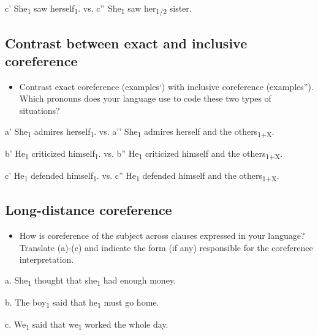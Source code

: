 \documentclass[output=paper]{langsci/langscibook} \label{AppendixA}
\begin{document}
c' She\textsubscript{1} saw herself\textsubscript{1}.    vs.   c’’ She\textsubscript{1} saw her\textsubscript{1/2} sister. 


\subsection{Contrast between exact and inclusive coreference} 
\begin{itemize}
\item
Contrast exact coreference (examples‘) with inclusive coreference (examples”). Which pronouns does your language use to code these two types of situations? 

\end{itemize}

a’ She\textsubscript{1} admires herself\textsubscript{1}.   vs.   a’’ She\textsubscript{1} admires herself and the others\textsubscript{1+X}. 



b’ He\textsubscript{1} criticized himself\textsubscript{1}.   vs.   b” He\textsubscript{1} criticized himself and the others\textsubscript{1+X}. 


c’ He\textsubscript{1} defended himself\textsubscript{1}.   vs.   c” He\textsubscript{1} defended himself and the others\textsubscript{1+X}. 

\subsection{Long-distance coreference} 
\begin{itemize}
\item
How is coreference of the subject across clauses expressed in your language? Translate (a)-(c) and indicate the form (if any) responsible for the coreference interpretation. 

\end{itemize}

a. She\textsubscript{1} thought that she\textsubscript{1} had enough money. 



b. The boy\textsubscript{1} said that he\textsubscript{1} must go home. 



c. We\textsubscript{1} said that we\textsubscript{1} worked the whole day. 


\sloppy\printbibliography[heading=subbibliography,notkeyword=this]
\end{document}
